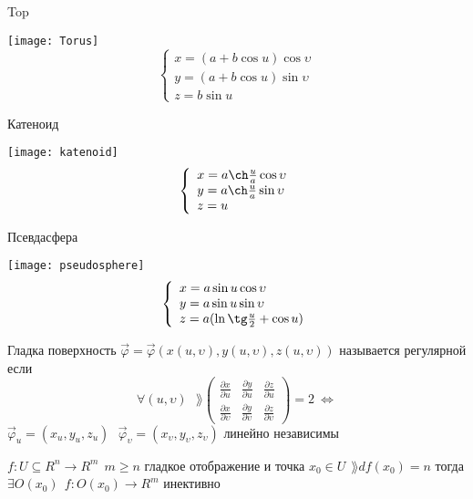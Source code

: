 \begin{block}[Примеры]
  \begin{center}
    Top
  \end{center}
  \texttt{[image: Torus]}
  $$
  \left\{
  \begin{array}{l}
    x = (a + b\cos u) \cos \upsilon \\
    y = (a + b\cos u) \sin \upsilon \\
    z = b \sin u
  \end{array}
  \right.
  $$
  \begin{center}
    Катеноид
  \end{center}
  \texttt{[image: katenoid]}
  $$
  \left\{
  \begin{array}{l}
    x = a \ch \frac{u}{a} \cos \upsilon \\
    y = a \ch \frac{u}{a} \sin \upsilon \\
    z = u
  \end{array}
  \right.
  $$
  \begin{center}
    Псевдасфера
  \end{center}
  \texttt{[image: pseudosphere]}
  $$
  \left\{
  \begin{array}{l}
    x = a \sin u \cos \upsilon \\
    y = a \sin u \sin \upsilon \\
    z = a( \ln \tg \frac{u}{2} + \cos u)
  \end{array}
  \right.
  $$
\end{block}

\begin{define}
  Гладка поверхность $\vec \varphi = \vec \varphi
  (x(u, \upsilon), y(u, \upsilon), z(u, \upsilon))$ называется регулярной если
  $$
  \forall (u, \upsilon) ~~~
  \rang \left(
  \begin{array}{ccc}
    \frac{\partial x}{\partial u} & \frac{\partial y}{\partial u} &
    \frac{\partial z}{\partial u} \\
    \frac{\partial x}{\partial \upsilon} &
    \frac{\partial y}{\partial \upsilon} &
    \frac{\partial z}{\partial \upsilon}
  \end{array}
  \right) = 2 ~ \Leftrightarrow
  $$
  $\vec \varphi_u = (x_u, y_u, z_u) ~~~ \vec \varphi_{\upsilon} =
  (x_{\upsilon}, y_{\upsilon}, z_{\upsilon})$ линейно независимы
\end{define}

\begin{theorem}
  $f: U \subseteq R^n \to R^m ~~ m \ge n$ гладкое отображение и точка
  $x_0 \in U ~~ \rang df(x_0) = n$ тогда $\exists O(x_0) ~~
  f: O(x_0) \to R^m$ инективно
\end{theorem}

